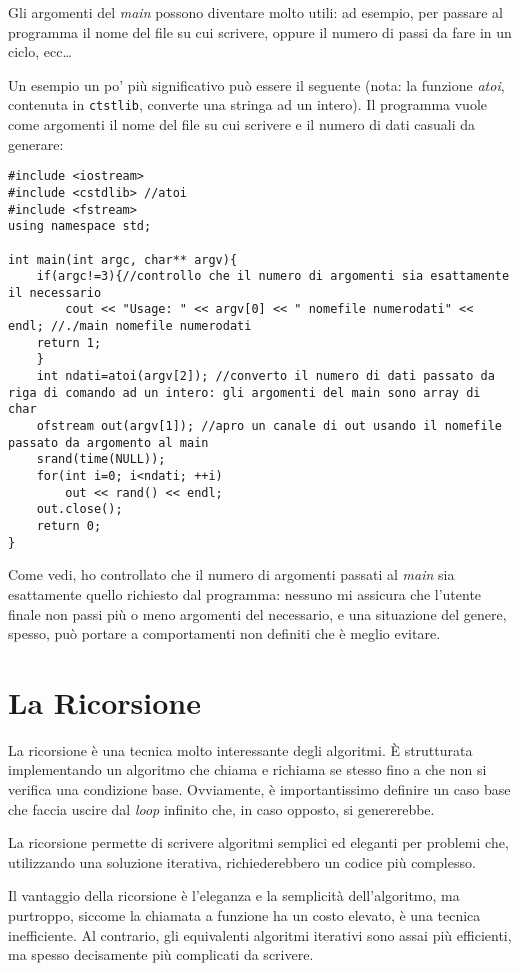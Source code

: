 \begin{subappendices}
Gli argomenti del \emph{main} possono diventare molto utili: ad esempio, per passare al programma il nome del file su cui scrivere, oppure il numero di passi da fare in un ciclo, ecc\ldots

Un esempio un po' più significativo può essere il seguente (nota: la funzione \emph{atoi}, contenuta in \verb|ctstlib|, converte una stringa ad un intero). Il programma vuole come argomenti il nome del file su cui scrivere e il numero di dati casuali da generare:
\begin{lstlisting}
#include <iostream>
#include <cstdlib> //atoi
#include <fstream>
using namespace std;

int main(int argc, char** argv){
	if(argc!=3){//controllo che il numero di argomenti sia esattamente il necessario
		cout << "Usage: " << argv[0] << " nomefile numerodati" << endl; //./main nomefile numerodati
	return 1;
	}   
	int ndati=atoi(argv[2]); //converto il numero di dati passato da riga di comando ad un intero: gli argomenti del main sono array di char
	ofstream out(argv[1]); //apro un canale di out usando il nomefile passato da argomento al main
	srand(time(NULL));
	for(int i=0; i<ndati; ++i)
		out << rand() << endl;
	out.close();
	return 0;
}
\end{lstlisting}

Come vedi, ho controllato che il numero di argomenti passati al \emph{main} sia esattamente quello richiesto dal programma: nessuno mi assicura che l'utente finale non passi più o meno argomenti del necessario, e una situazione del genere, spesso, può portare a comportamenti non definiti che è meglio evitare.
\section{La Ricorsione}\label{rico}
La ricorsione è una tecnica molto interessante degli algoritmi. È strutturata implementando un algoritmo che chiama e richiama se stesso fino a che non si verifica una condizione base. Ovviamente, è importantissimo definire un caso base che faccia uscire dal \emph{loop} infinito che, in caso opposto, si genererebbe.

La ricorsione permette di scrivere algoritmi semplici ed eleganti per problemi che, utilizzando una soluzione iterativa, richiederebbero un codice più complesso. 

Il vantaggio della ricorsione è l'eleganza e la semplicità dell'algoritmo, ma purtroppo, siccome la chiamata a funzione ha un costo elevato, è una tecnica inefficiente. Al contrario, gli equivalenti algoritmi iterativi sono assai più efficienti, ma spesso decisamente più complicati da scrivere.


\end{subappendices}
